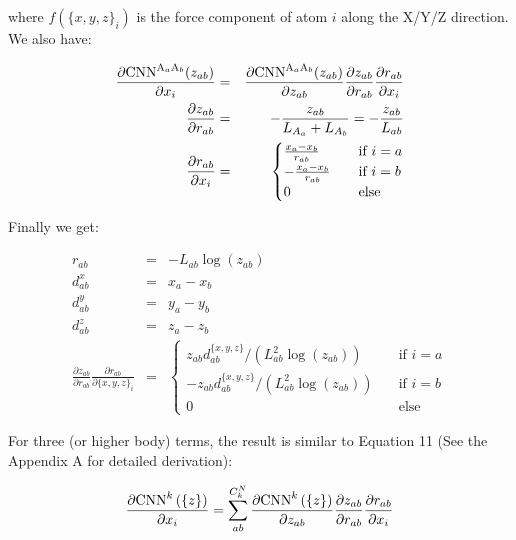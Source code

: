 \noindent where $f(\{x, y, z\}_{i})$ is the force component of atom $i$ along the X/Y/Z 
direction. We also have:

\begin{eqnarray}
%
%
\frac{
	\partial{\boldmath{\mathrm{CNN}}^{\mathrm{A}_{a}\mathrm{A}_{b}}(z_{ab})}
}{
	\partial{x_i}
} 
& = & 
\frac{\partial{
	\boldmath{\mathrm{CNN}}^{\mathrm{A}_{a}\mathrm{A}_{b}}(z_{ab})}
}{
	\partial{z_{ab}}
} \frac{\partial{z_{ab}}}{\partial{r_{ab}}} \frac{\partial{r_{ab}}}{\partial{x_i}} \\
%
%
\frac{ \partial{z_{ab}}}{\partial{r_{ab}}} 
& = & 
-\frac{z_{ab}}{L_{A_a} + L_{A_b}} = -\frac{z_{ab}}{L_{ab}} \\
%
%
\frac{\partial{r_{ab}}}{\partial{x_i}} & = & \begin{cases}
	\frac{x_a - x_b}{r_{ab}} & \quad \text{if } i = a \\
	-\frac{x_a - x_b}{r_{ab}} & \quad \text{if } i = b \\
	0                        & \quad \text{else}
\end{cases} 
\end{eqnarray}

\noindent Finally we get:

\begin{eqnarray}
r_{ab} & = & -L_{ab}\log{\left( z_{ab} \right)} \\
d^x_{ab} & = & x_{a} - x_{b} \\
d^y_{ab} & = & y_{a} - y_{b} \\
d^z_{ab} & = & z_{a} - z_{b} \\
\frac{\partial{z_{ab}}}{\partial{r_{ab}}} \frac{\partial{r_{ab}}}{\partial{\{x, y, z\}_i}} 
& = &
\begin{cases}
z_{ab} d^{\{x,y,z\}}_{ab} / (L_{ab}^{2} \log{(z_{ab})}) & \quad \text{if } i = a \\
-z_{ab} d^{\{x,y,z\}}_{ab} / (L_{ab}^{2} \log{(z_{ab})}) & \quad \text{if } i = b \\
0 & \quad \text{else}
\end{cases}
\end{eqnarray}

For three (or higher body) terms, the result is similar to Equation 11 (See the Appendix 
A for detailed derivation):

\begin{eqnarray}
\frac{
	\partial{\boldmath{\mathrm{CNN}}^{k}\left(\left\{ z \right\} \right)}
}{
	\partial{x_i}
} 
=  \sum_{ab}^{C^N_k}{
\frac{
	\partial{\boldmath{\mathrm{CNN}}^{k}\left(\left\{ z \right\} \right)}
}{
	\partial{z_{ab}}
} \frac{\partial{z_{ab}}}{\partial{r_{ab}}}\frac{\partial{r_{ab}}}{\partial{x_i}}}
\end{eqnarray}

